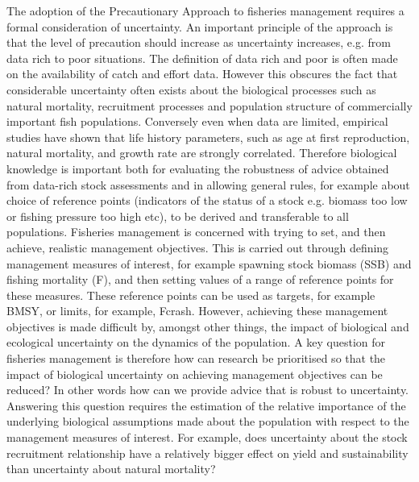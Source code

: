 \documentclass[%
nonumbib,      %
%
]{nrc1}                          %
\begin{document}
\begin{resume}
\end{resume}

\maketitle

The adoption of the Precautionary Approach to fisheries management \citep[PA,][]{garcia1996precautionary} requires a formal consideration of uncertainty. An important principle of the approach is that the level of precaution should increase as uncertainty increases, e.g. from data rich to poor situations. The definition of data rich and poor is often made on the availability of catch and effort data. However this obscures the fact that considerable uncertainty often exists about the biological processes such as natural mortality, recruitment processes and population structure of commercially important fish populations. Conversely even when data are limited, empirical studies have shown that life history parameters, such as age at first reproduction, natural mortality, and growth rate are strongly correlated. Therefore biological knowledge is important both for evaluating the robustness of advice obtained from data-rich stock assessments and in allowing general rules, for example about choice of reference points (indicators of the status of a stock e.g. biomass too low or fishing pressure too high etc), to be derived and transferable to all populations. 
Fisheries management is concerned with trying to set, and then achieve, realistic management objectives. This is carried out through defining management measures of interest, for example spawning stock biomass (SSB) and fishing mortality (F), and then setting values of a range of reference points for these measures. These reference points can be used as targets, for example BMSY, or limits, for example, Fcrash. However, achieving these management objectives is made difficult by, amongst other things, the impact of biological and ecological uncertainty on the dynamics of the population. 
A key question for fisheries management is therefore how can research be prioritised so that the impact of biological uncertainty on achieving management objectives can be reduced? In other words how can we provide advice that is robust to uncertainty. Answering this question requires the estimation of the relative importance of the underlying biological assumptions made about the population with respect to the management measures of interest. For example, does uncertainty about the stock recruitment relationship have a relatively bigger eﬀect on yield and sustainability than uncertainty about natural mortality? 
\end{document}
